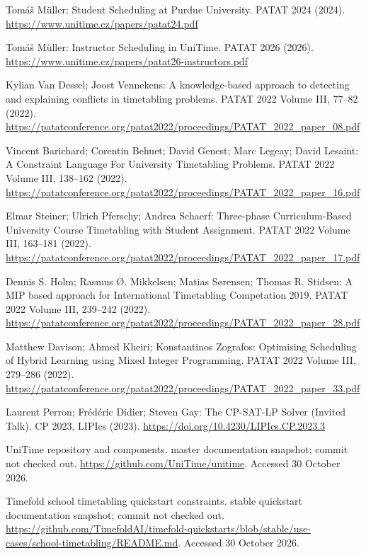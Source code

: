  Tom{\'a}{\v s} M{\"u}ller: Student Scheduling at Purdue University. PATAT 2024 (2024). \url{https://www.unitime.cz/papers/patat24.pdf}

 Tom{\'a}{\v s} M{\"u}ller: Instructor Scheduling in UniTime. PATAT 2026 (2026). \url{https://www.unitime.cz/papers/patat26-instructors.pdf}

 Kylian Van Dessel; Joost Vennekens: A knowledge-based approach to detecting and explaining conflicts in timetabling problems. PATAT 2022 Volume III, 77--82 (2022). \url{https://patatconference.org/patat2022/proceedings/PATAT_2022_paper_08.pdf}

 Vincent Barichard; Corentin Behuet; David Genest; Marc Legeay; David Lesaint: A Constraint Language For University Timetabling Problems. PATAT 2022 Volume III, 138--162 (2022). \url{https://patatconference.org/patat2022/proceedings/PATAT_2022_paper_16.pdf}

 Elmar Steiner; Ulrich Pferschy; Andrea Schaerf: Three-phase Curriculum-Based University Course Timetabling with Student Assignment. PATAT 2022 Volume III, 163--181 (2022). \url{https://patatconference.org/patat2022/proceedings/PATAT_2022_paper_17.pdf}

 Dennis S. Holm; Rasmus {\O}. Mikkelsen; Matias S{\o}rensen; Thomas R. Stidsen: A MIP based approach for International Timetabling Competation 2019. PATAT 2022 Volume III, 239--242 (2022). \url{https://patatconference.org/patat2022/proceedings/PATAT_2022_paper_28.pdf}

 Matthew Davison; Ahmed Kheiri; Konstantinos Zografos: Optimising Scheduling of Hybrid Learning using Mixed Integer Programming. PATAT 2022 Volume III, 279--286 (2022). \url{https://patatconference.org/patat2022/proceedings/PATAT_2022_paper_33.pdf}

 Laurent Perron; Fr{\'e}d{\'e}ric Didier; Steven Gay: The CP-SAT-LP Solver (Invited Talk). CP 2023, LIPIcs (2023). \url{https://doi.org/10.4230/LIPIcs.CP.2023.3}

 UniTime repository and components. master documentation snapshot; commit not checked out. \url{https://github.com/UniTime/unitime}. Accessed 30 October 2026.

 Timefold school timetabling quickstart constraints. stable quickstart documentation snapshot; commit not checked out. \url{https://github.com/TimefoldAI/timefold-quickstarts/blob/stable/use-cases/school-timetabling/README.md}. Accessed 30 October 2026.


